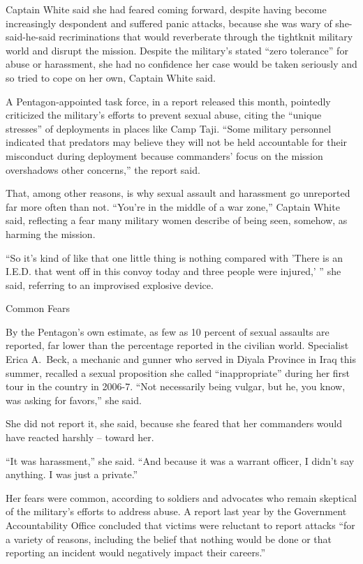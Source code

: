 ﻿\documentclass[12pt]{article}
\begin{document}
Captain White said she had feared coming forward, despite having become increasingly despondent and
suffered panic attacks, because she was wary of she-said-he-said recriminations that would
reverberate through the tightknit military world and disrupt the mission. Despite the military's
stated ``zero tolerance'' for abuse or harassment, she had no confidence her case would be taken
seriously and so tried to cope on her own, Captain White said.

A Pentagon-appointed task force, in a report released this month, pointedly criticized the
military's efforts to prevent sexual abuse, citing the ``unique stresses'' of deployments in places
like Camp Taji. ``Some military personnel indicated that predators may believe they will not be held
accountable for their misconduct during deployment because commanders' focus on the mission
overshadows other concerns,'' the report said.

That, among other reasons, is why sexual assault and harassment go unreported far more often than
not. ``You're in the middle of a war zone,'' Captain White said, reflecting a fear many military
women describe of being seen, somehow, as harming the mission.

``So it's kind of like that one little thing is nothing compared with 'There is an I.E.D. that went
off in this convoy today and three people were injured,' '' she said, referring to an improvised
explosive device.

Common Fears

By the Pentagon's own estimate, as few as 10 percent of sexual assaults are reported, far lower than
the percentage reported in the civilian world. Specialist Erica A.~Beck, a mechanic and gunner who
served in Diyala Province in Iraq this summer, recalled a sexual proposition she called
``inappropriate'' during her first tour in the country in 2006-7. ``Not necessarily being vulgar,
but he, you know, was asking for favors,'' she said.

She did not report it, she said, because she feared that her commanders would have reacted harshly
-- toward her.

``It was harassment,'' she said. ``And because it was a warrant officer, I didn't say anything. I
was just a private.''

Her fears were common, according to soldiers and advocates who remain skeptical of the military's
efforts to address abuse. A report last year by the Government Accountability Office concluded that
victims were reluctant to report attacks ``for a variety of reasons, including the belief that
nothing would be done or that reporting an incident would negatively impact their careers.''
\end{document}
